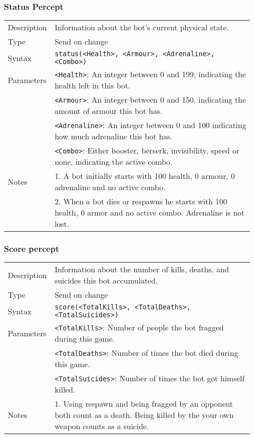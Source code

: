 \documentclass[11pt,a4paper]{article}
\begin{document}
\subsubsection*{Status Percept}
\begin{small}
\begin{tabular}{p{2cm}p{9cm}}
Description & Information about the bot's current physical state.\\
Type & Send on change\\
Syntax & \verb|status(<Health>, <Armour>, <Adrenaline>, <Combo>)|\\
Parameters & 
 \verb|<Health>|: An integer between 0 and 199, indicating the health left in this bot.\\
& \verb|<Armour>|: An integer between 0 and 150, indicating the amount of armour this bot has.\\
& \verb|<Adrenaline>|: An integer between 0 and 100 indicating how much adrenaline this bot has.\\
& \verb|<Combo>|: Either booster, berserk, invisibility, speed or none, indicating the active combo.	\\
Notes 
&	1.	A bot initially starts with 100 health, 0 armour, 0 adrenaline and no active combo.\\
&	2. 	When a bot dies or respawns he starts with 100 health, 0 armor and no active combo. Adrenaline is not lost.\\
\end{tabular}
\end{small}


\subsubsection*{Score percept}
\begin{small}
\begin{tabular}{p{2cm}p{9cm}}
Description & Information about the number of kills, deaths, and suicides this bot accumulated.\\
Type & Send on change\\
Syntax & \verb|score(<TotalKills>, <TotalDeaths>, <TotalSuicides>)|\\
Parameters & 
\verb|<TotalKills>|: Number of people the bot fragged during this game.\\
& \verb|<TotalDeaths>|: Number of times the bot died during this game.\\
& \verb|<TotalSuicides>|: Number of times the bot got himself killed.\\
Notes &
	1.	Using respawn and being fragged by an opponent both count as a death. Being killed by the your own weapon counts as a suicide.
\end{tabular}
\end{small}
\end{document}
